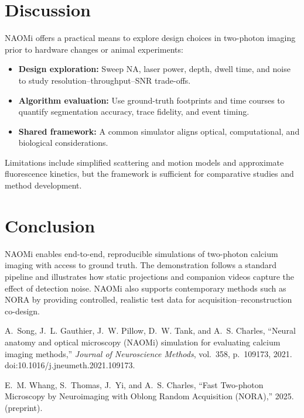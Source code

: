 \documentclass[conference]{IEEEtran}
\begin{document}
\section{Discussion}\label{sec:discussion}
NAOMi offers a practical means to explore design choices in two-photon imaging prior to hardware changes or animal experiments:
\begin{itemize}
  \item \textbf{Design exploration:} Sweep NA, laser power, depth, dwell time, and noise to study resolution--throughput--SNR trade-offs.
  \item \textbf{Algorithm evaluation:} Use ground-truth footprints and time courses to quantify segmentation accuracy, trace fidelity, and event timing.
  \item \textbf{Shared framework:} A common simulator aligns optical, computational, and biological considerations.
\end{itemize}
Limitations include simplified scattering and motion models and approximate fluorescence kinetics, but the framework is sufficient for comparative studies and method development.

\section{Conclusion}\label{sec:conclusion}
NAOMi enables end-to-end, reproducible simulations of two-photon calcium imaging with access to ground truth. The demonstration follows a standard pipeline and illustrates how static projections and companion videos capture the effect of detection noise. NAOMi also supports contemporary methods such as NORA by providing controlled, realistic test data for acquisition--reconstruction co-design.

\begin{thebibliography}{99}
A.~Song, J.~L. Gauthier, J.~W. Pillow, D.~W. Tank, and A.~S. Charles, ``Neural anatomy and optical microscopy (NAOMi) simulation for evaluating calcium imaging methods,'' \emph{Journal of Neuroscience Methods}, vol.~358, p.~109173, 2021. doi:10.1016/j.jneumeth.2021.109173.

E.~M. Whang, S.~Thomas, J.~Yi, and A.~S. Charles, ``Fast Two-photon Microscopy by Neuroimaging with Oblong Random Acquisition (NORA),'' 2025. (preprint).
\end{thebibliography}
\end{document}
